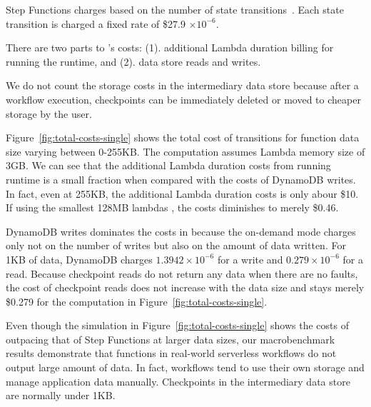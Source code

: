 Step Functions charges based on the number of state
transitions~\cite{aws-step-functions-pricing}. Each state transition is charged
a fixed rate of \$27.9 $ \times 10^{-6}$.

There are two parts to \name{}'s costs: (1). additional Lambda duration
billing for running the \name{} runtime, and (2). data store reads and writes.

We do not count the storage costs in the intermediary data store because after
a workflow execution, checkpoints can be immediately deleted or moved to
cheaper storage by the user.

Figure~\ref{fig:total-costs-single} shows the total cost of transitions for
function data size varying between 0-255KB. The computation assumes Lambda
memory size of 3GB. We can see that the additional Lambda duration costs from
running \name{} runtime is a small fraction when compared with the costs of
DynamoDB writes. 
In fact, even at 255KB, the additional Lambda
duration costs is only abour \$10. If using the smallest 128MB lambdas , the
costs diminishes to merely \$0.46.

DynamoDB writes dominates the costs in \name{} because the on-demand mode
charges only not on the number of writes but also on the amount of data
written. For 1KB of data, DynamoDB charges $1.3942 \times 10^{-6}$ for a write
and $0.279 \times 10^{-6}$ for a read. Because checkpoint reads do not return
any data when there are no faults, the cost of checkpoint reads does not
increase with the data size and stays merely \$0.279 for the computation in
Figure~\ref{fig:total-costs-single}.

Even though the simulation in Figure~\ref{fig:total-costs-single} shows the
costs of \name{} outpacing that of Step Functions at larger data sizes, our
macrobenchmark results demonstrate that functions in real-world serverless
workflows do not output large amount of data. In fact, workflows tend to use
their own storage and manage application data manually. Checkpoints in the
\name{} intermediary data store are normally under 1KB. 

